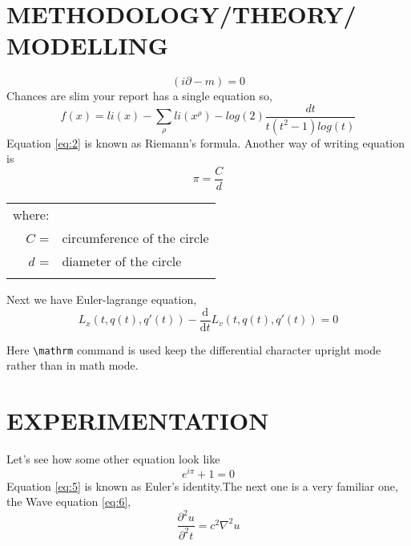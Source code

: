 \documentclass[12pt,a4paper]{report}
\begin{document}
\chapter{\MakeUppercase{Methodology/Theory/ Modelling}}
\lipsum[1]
\[(i \partial -m) = 0 \]
Chances are slim your report has a single equation so,
\begin{equation}
    \label{eq:2}
    f(x) = li(x)-\sum_{\rho}li(x^{\rho}) -  log(2) \frac{dt}{t(t^{2}-1)log(t)}
\end{equation}
Equation \ref{eq:2} is known as Riemann's formula. Another way of writing equation is \\
\begin{equation}
    \label{eq:3}
    \pi = \frac{C}{d}
\end{equation}
\hspace*{5cm} %
\begin{tabular}{rl}
where:\\
    $C$ =& circumference of the circle \\
    $d$ =& diameter of the circle  \\
    \\
\end{tabular}

Next we have Euler-lagrange equation, 
\begin{equation}
    \label{eq:4}
    L_{x}(t,q(t),q'(t)) - \frac{\mathrm{d}}
    {\mathrm{d}t} L_{v}(t,q(t),q'(t))= 0
\end{equation}

Here \lstinline[language={[LaTeX]TeX},basicstyle=\ttfamily]{\mathrm} command is used keep the differential character upright mode rather than in math mode.

\chapter{\MakeUppercase{Experimentation}}
\lipsum[1]
Let's see how some other equation look like 
\begin{equation}
    \label{eq:5}
    e^{i\pi} + 1 = 0
\end{equation}
Equation \ref{eq:5} is known as Euler's identity.The next one is a very familiar one, the Wave equation \ref{eq:6},
\begin{equation}  \label{eq:6}
\frac{\partial^2{u}}{\partial^2{t}} = c^2 \nabla^2 u
\end{equation}
\end{document}
